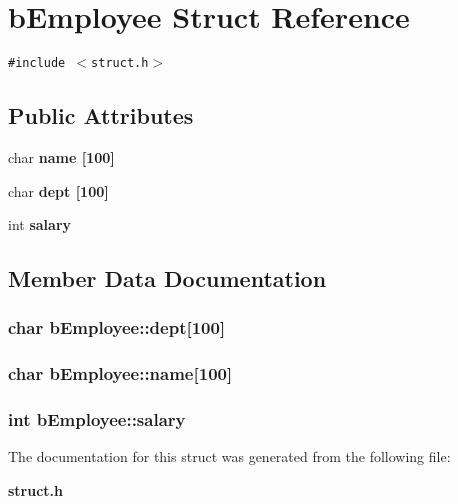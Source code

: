 \section{b\-Employee Struct Reference}
\label{structbEmployee}
{\tt \#include $<$struct.h$>$}

\subsection*{Public Attributes}
\begin{CompactItemize}
\item 
char \bf{name} [100]
\item 
char \bf{dept} [100]
\item 
int \bf{salary}
\end{CompactItemize}


\subsection{Member Data Documentation}
\subsubsection{\setlength{\rightskip}{0pt plus 5cm}char \bf{b\-Employee::dept}[100]}\label{structbEmployee_420036d1f9daed90239a8827ec69878c}


\subsubsection{\setlength{\rightskip}{0pt plus 5cm}char \bf{b\-Employee::name}[100]}\label{structbEmployee_340e9a1e8fff5318b132dbc6596841bc}


\subsubsection{\setlength{\rightskip}{0pt plus 5cm}int \bf{b\-Employee::salary}}\label{structbEmployee_e16a7170b6027288143c2374a9ce7957}




The documentation for this struct was generated from the following file:\begin{CompactItemize}
\item 
\bf{struct.h}\end{CompactItemize}
